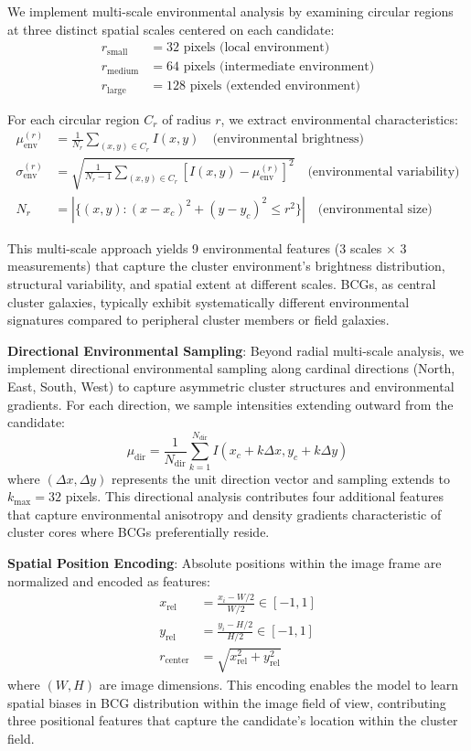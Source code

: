 \documentclass[twocolumn,10pt]{aastex631}
\begin{document}
We implement multi-scale environmental analysis by examining circular regions at three distinct spatial scales centered on each candidate:
\begin{align}
r_{\text{small}} &= 32\text{ pixels (local environment)} \\
r_{\text{medium}} &= 64\text{ pixels (intermediate environment)} \\
r_{\text{large}} &= 128\text{ pixels (extended environment)}
\end{align}

For each circular region $C_r$ of radius $r$, we extract environmental characteristics:
\begin{align}
\mu_{\text{env}}^{(r)} &= \frac{1}{N_r} \sum_{(x,y) \in C_r} I(x,y) \quad \text{(environmental brightness)} \\
\sigma_{\text{env}}^{(r)} &= \sqrt{\frac{1}{N_r-1} \sum_{(x,y) \in C_r} [I(x,y) - \mu_{\text{env}}^{(r)}]^2} \quad \text{(environmental variability)} \\
N_r &= |\{(x,y) : (x-x_c)^2 + (y-y_c)^2 \leq r^2\}| \quad \text{(environmental size)}
\end{align}

This multi-scale approach yields 9 environmental features (3 scales × 3 measurements) that capture the cluster environment's brightness distribution, structural variability, and spatial extent at different scales. BCGs, as central cluster galaxies, typically exhibit systematically different environmental signatures compared to peripheral cluster members or field galaxies.

\textbf{Directional Environmental Sampling}: Beyond radial multi-scale analysis, we implement directional environmental sampling along cardinal directions (North, East, South, West) to capture asymmetric cluster structures and environmental gradients. For each direction, we sample intensities extending outward from the candidate:
\begin{equation}
\mu_{\text{dir}} = \frac{1}{N_{\text{dir}}} \sum_{k=1}^{N_{\text{dir}}} I(x_c + k\Delta x, y_c + k\Delta y)
\end{equation}
where $(\Delta x, \Delta y)$ represents the unit direction vector and sampling extends to $k_{\max} = 32$ pixels. This directional analysis contributes four additional features that capture environmental anisotropy and density gradients characteristic of cluster cores where BCGs preferentially reside.

\textbf{Spatial Position Encoding}: Absolute positions within the image frame are normalized and encoded as features:
\begin{align}
x_{\text{rel}} &= \frac{x_i - W/2}{W/2} \in [-1, 1] \\
y_{\text{rel}} &= \frac{y_i - H/2}{H/2} \in [-1, 1] \\
r_{\text{center}} &= \sqrt{x_{\text{rel}}^2 + y_{\text{rel}}^2}
\end{align}
where $(W, H)$ are image dimensions. This encoding enables the model to learn spatial biases in BCG distribution within the image field of view, contributing three positional features that capture the candidate's location within the cluster field.
\end{document}
